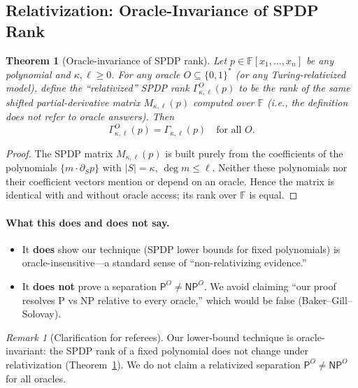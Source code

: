 \documentclass[12pt]{article}
\newtheorem{theorem}{Theorem}
\theoremstyle{definition}
\theoremstyle{definition}
\theoremstyle{remark}
\newtheorem{remark}{Remark}
\theoremstyle{remark}
\begin{document}
\subsection{Relativization: Oracle-Invariance of SPDP Rank}

\begin{theorem}[Oracle-invariance of SPDP rank]\label{thm:oracle-invariance}
Let $p \in \mathbb{F}[x_1,\ldots,x_n]$ be any polynomial and $\kappa,\ell \geq 0$. For any oracle $O \subseteq \{0,1\}^*$ (or any Turing-relativized model), define the ``relativized'' SPDP rank $\Gamma_{\kappa,\ell}^O(p)$ to be the rank of the same shifted partial-derivative matrix $M_{\kappa,\ell}(p)$ computed over $\mathbb{F}$ (i.e., the definition does not refer to oracle answers). Then
\[
\Gamma_{\kappa,\ell}^O(p) = \Gamma_{\kappa,\ell}(p) \quad\text{for all } O.
\]
\end{theorem}

\begin{proof}
The SPDP matrix $M_{\kappa,\ell}(p)$ is built purely from the coefficients of the polynomials $\{m \cdot \partial_S p\}$ with $|S| = \kappa$, $\deg m \leq \ell$. Neither these polynomials nor their coefficient vectors mention or depend on an oracle. Hence the matrix is identical with and without oracle access; its rank over $\mathbb{F}$ is equal.
\end{proof}

\paragraph{What this does and does not say.}
\begin{itemize}
\item It \textbf{does} show our technique (SPDP lower bounds for fixed polynomials) is oracle-insensitive---a standard sense of ``non-relativizing evidence.''
\item It \textbf{does not} prove a separation $\mathsf{P}^O \neq \mathsf{NP}^O$. We avoid claiming ``our proof resolves P vs NP relative to every oracle,'' which would be false (Baker--Gill--Solovay).
\end{itemize}

\begin{remark}[Clarification for referees]
Our lower-bound technique is oracle-invariant: the SPDP rank of a fixed polynomial does not change under relativization (Theorem~\ref{thm:oracle-invariance}). We do not claim a relativized separation $\mathsf{P}^O \neq \mathsf{NP}^O$ for all oracles.
\end{remark}
\end{document}
